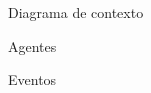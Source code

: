 
\begin{subsection}{Diagrama de contexto}

\end{subsection}

\begin{subsection}{Agentes}

\end{subsection}

\begin{subsection}{Eventos}

\end{subsection} 